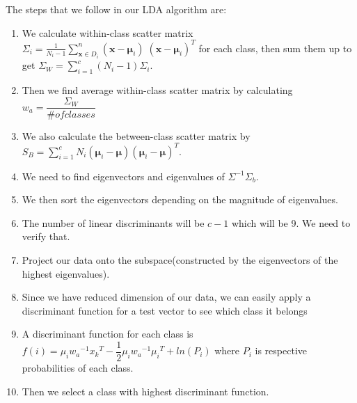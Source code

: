 The steps that we follow in our LDA algorithm are: 
\begin{enumerate}
	\item We calculate within-class scatter matrix $\Sigma_i = \frac{1}{N_{i}-1} \sum\limits_{\pmb x \in D_i}^n (\pmb x - \pmb \mu_i)\;(\pmb x - \pmb \mu_i)^T$ for each class, then sum them up to get $\Sigma_W = \sum\limits_{i =1}^{c} (N_i - 1) \Sigma_i  $.
	\item Then we find average within-class scatter matrix by calculating $w_a =\dfrac{\Sigma_W}{\# of classes}$
	\item We also calculate the between-class scatter matrix by $S_B = \sum\limits_{i =1}^c N_i (\pmb \mu_i - \pmb \mu) (\pmb \mu_i - \pmb \mu)^T$.
	\item We need to find eigenvectors and eigenvalues of $\Sigma^{-1} \Sigma_b$.
	\item We then sort the eigenvectors depending on the magnitude of eigenvalues.
	\item The number of linear discriminants will be $c-1$ which will be 9. We need to verify that.
	\item Project our data onto the subspace(constructed by the eigenvectors of the highest eigenvalues).
	\item Since we have reduced dimension of our data, we can easily apply a discriminant function for a test vector to see which class it belongs
	\item A discriminant function for each class is $f(i) = \mu_i {w_a}^{-1} {x_k}^T - \dfrac{1}{2} \mu_i {w_a}^{-1} {\mu_i}^T + ln(P_i)$ where $P_i$ is respective probabilities of each class.
	\item Then we select a class with highest discriminant function.
\end{enumerate}

